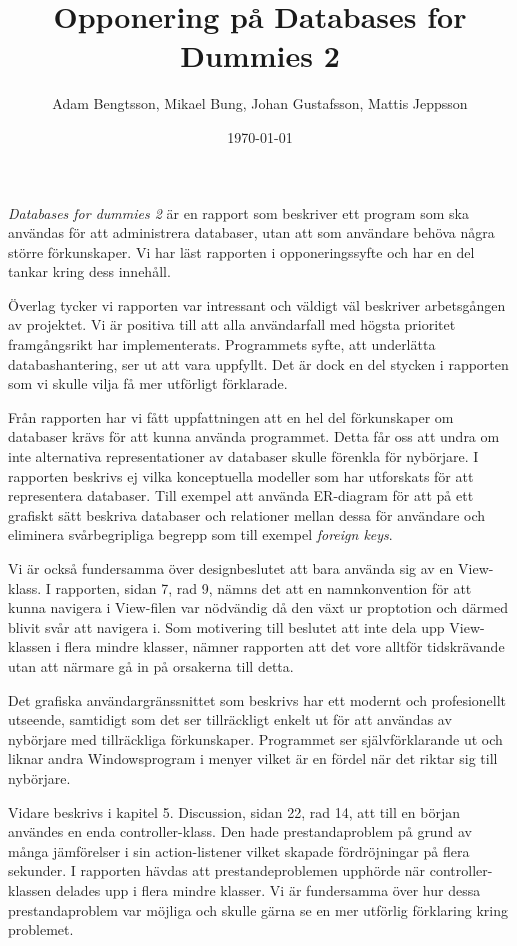 \documentclass[a4paper, 12pt]{article}
\begin{document}
\title{Opponering på Databases for Dummies 2}
\author{
    Adam Bengtsson, 
    Mikael Bung, 
    Johan Gustafsson, 
    Mattis Jeppsson 
}
\date{\today}
\maketitle
    

\emph{Databases for dummies 2} är en rapport som beskriver ett program som ska användas för att administrera databaser, utan att som användare behöva några större förkunskaper. Vi har läst rapporten i opponeringssyfte och har en del tankar kring dess innehåll.

Överlag tycker vi rapporten var intressant och väldigt väl beskriver arbetsgången av projektet. Vi är positiva till att alla användarfall med högsta prioritet framgångsrikt har implementerats. Programmets syfte, att underlätta databashantering, ser ut att vara uppfyllt. Det är dock en del stycken i rapporten som vi skulle vilja få mer utförligt förklarade.

Från rapporten har vi fått uppfattningen att en hel del förkunskaper om databaser krävs för att kunna använda programmet. Detta får oss att undra om inte alternativa representationer av databaser skulle förenkla för nybörjare. I rapporten beskrivs ej vilka konceptuella modeller som har utforskats för att representera databaser. Till exempel att använda ER-diagram för att på ett grafiskt sätt beskriva databaser och relationer mellan dessa för användare och eliminera svårbegripliga begrepp som till exempel \emph{foreign keys}.

Vi är också fundersamma över designbeslutet att bara använda sig av en View-klass. I rapporten, sidan 7, rad 9,  nämns det att en namnkonvention för att kunna navigera i View-filen var nödvändig då den växt ur proptotion och därmed blivit svår att navigera i. Som motivering till beslutet att inte dela upp View-klassen i flera mindre klasser, nämner rapporten att det vore alltför tidskrävande utan att närmare gå in på orsakerna till detta.

Det grafiska användargränssnittet som beskrivs har ett modernt och profesionellt utseende, samtidigt som det ser tillräckligt enkelt ut för att användas av nybörjare med tillräckliga förkunskaper. Programmet ser självförklarande ut och liknar andra Windowsprogram i menyer vilket är en fördel när det riktar sig till nybörjare. 

Vidare beskrivs i kapitel 5. Discussion, sidan 22, rad 14, att till en början användes en enda controller-klass. Den hade prestandaproblem på grund av många jämförelser i sin action-listener vilket skapade fördröjningar på flera sekunder. I rapporten hävdas att prestandeproblemen upphörde när controller-klassen delades upp i flera mindre klasser. Vi är fundersamma över hur dessa prestandaproblem var möjliga och skulle gärna se en mer utförlig förklaring kring problemet. 
\end{document}

